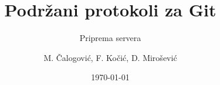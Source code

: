 \documentclass{beamer}
\title{Podržani protokoli za Git}
\subtitle{Priprema servera}
\author{M. Čalogović, F. Kočić, D. Mirošević}
\institute{Sveučilište u Rijeci - Tehnički fakultet}
\date{\today}
\begin{document}
\titlepage
\end{document}
